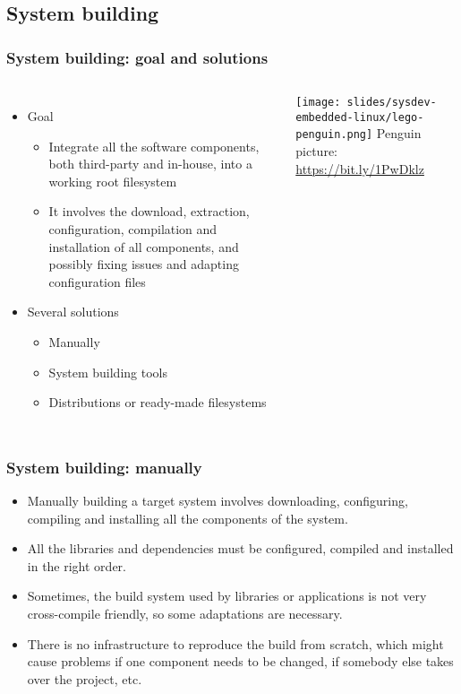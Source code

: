 \subsection{System building}

\begin{frame}
  \frametitle{System building: goal and solutions}
  \begin{columns}
    \begin{itemize}
    \item Goal
      \begin{itemize}
      \item Integrate all the software components, both third-party and
        in-house, into a working root filesystem
      \item It involves the download, extraction, configuration,
        compilation and installation of all components, and possibly
        fixing issues and adapting configuration files
      \end{itemize}
    \item Several solutions
      \begin{itemize}
      \item Manually
      \item System building tools
      \item Distributions or ready-made filesystems
      \end{itemize}
    \end{itemize}
    \texttt{[image: slides/sysdev-embedded-linux/lego-penguin.png]}
    \vfill
    {\tiny Penguin picture: \url{https://bit.ly/1PwDklz}}
  \end{columns}
\end{frame}

\begin{frame}
  \frametitle{System building: manually}
  \begin{itemize}
  \item Manually building a target system involves downloading,
    configuring, compiling and installing all the components of the
    system.
  \item All the libraries and dependencies must be configured,
    compiled and installed in the right order.
  \item Sometimes, the build system used by libraries or applications
    is not very cross-compile friendly, so some adaptations are
    necessary.
  \item There is no infrastructure to reproduce the build from
    scratch, which might cause problems if one component needs to be
    changed, if somebody else takes over the project, etc.
  \end{itemize}
\end{frame}


